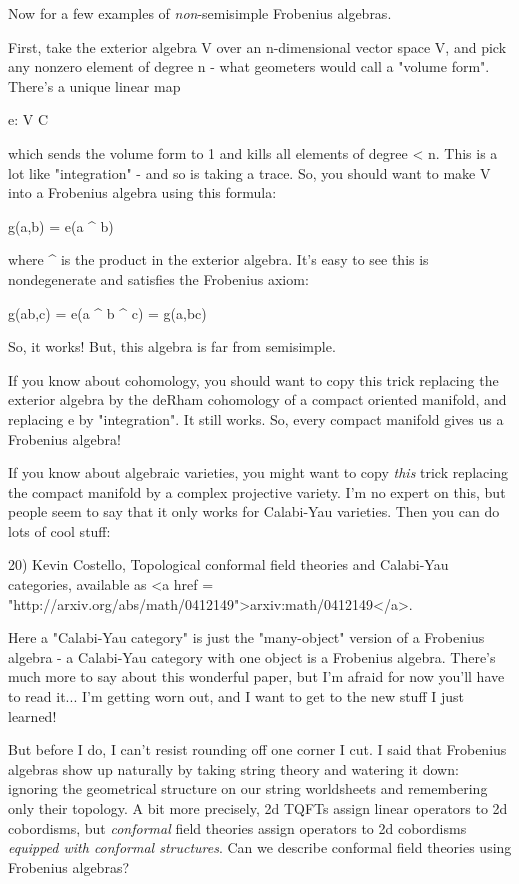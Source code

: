 Now for a few examples of \emph{non}-semisimple Frobenius algebras.

First, take the exterior algebra \Lambda V over an n-dimensional
vector space V, and pick any nonzero element of degree n - what
geometers would call a "volume form".  There's a unique
linear map

e: \Lambda V \to  C

which sends the volume form to 1 and kills all elements of degree <
n.  This is a lot like "integration" - and so is taking a
trace.  So, you should want to make \Lambda V into a Frobenius
algebra using this formula:

g(a,b) = e(a ^ b)

where ^ is the product in the exterior algebra.  It's easy to see
this is nondegenerate and satisfies the Frobenius axiom:

g(ab,c) = e(a ^ b ^ c) = g(a,bc)

So, it works!  But, this algebra is far from semisimple.  

If you know about cohomology, you should want to copy this trick
replacing the exterior algebra by the deRham cohomology of a compact
oriented manifold, and replacing e by "integration".  It
still works.  So, every compact manifold gives us a Frobenius algebra!

If you know about algebraic varieties, you might want to copy \emph{this}
trick replacing the compact manifold by a complex projective variety.  
I'm no expert on this, but people seem to say that it only works for
Calabi-Yau varieties.  Then you can do lots of cool stuff:

20) Kevin Costello, Topological conformal field theories and 
Calabi-Yau categories, available as <a href = "http://arxiv.org/abs/math/0412149">arxiv:math/0412149</a>.

Here a "Calabi-Yau category" is just the "many-object" version of
a Frobenius algebra - a Calabi-Yau category with one object is a 
Frobenius algebra.  There's much more to say about this wonderful
paper, but I'm afraid for now you'll have to read it... I'm getting
worn out, and I want to get to the new stuff I just learned!

But before I do, I can't resist rounding off one corner I cut.  I said
that Frobenius algebras show up naturally by taking string theory and
watering it down: ignoring the geometrical structure on our string
worldsheets and remembering only their topology.  A bit more
precisely, 2d TQFTs assign linear operators to 2d cobordisms, but
\emph{conformal} field theories assign operators to 2d cobordisms
\emph{equipped with conformal structures}.  Can we describe
conformal field theories using Frobenius algebras?

